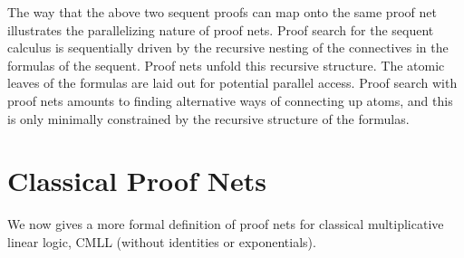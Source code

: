 The way that the above two sequent proofs can map onto the same proof net
illustrates the parallelizing nature of proof nets.  Proof search for
the sequent calculus is sequentially driven by the recursive nesting of the 
connectives in the formulas of the sequent.  Proof nets unfold this recursive 
structure. The atomic leaves of the formulas are laid out for potential parallel
access. Proof search with proof nets amounts to finding alternative ways of
connecting up atoms, and this is only minimally constrained by the recursive
structure of the formulas. 


\section{Classical Proof Nets}

We now gives a more formal definition of proof nets for classical multiplicative
linear logic, CMLL (without identities or exponentials).

